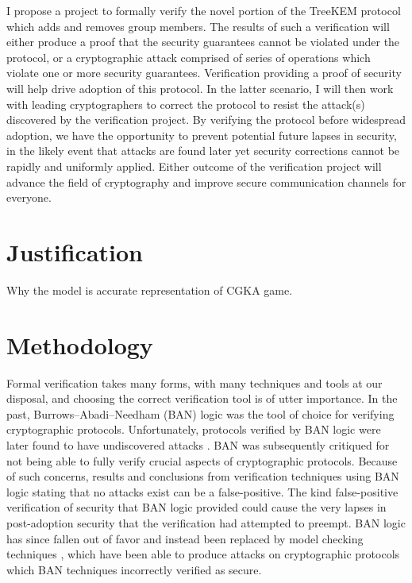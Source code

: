 \documentclass[12pt,twocolumn]{article}
\begin{document}
	I propose a project to formally verify the novel portion of the TreeKEM protocol which adds and removes group members.
	The results of such a verification will either produce a proof that the security guarantees cannot be violated under the protocol, or a cryptographic attack comprised of series of operations which violate one or more security guarantees.
	Verification providing a proof of security will help drive adoption of this protocol.
	In the latter scenario, I will then work with leading cryptographers to correct the protocol to resist the attack(s) discovered by the verification project.
	By verifying the protocol before widespread adoption, we have the opportunity to prevent potential future lapses in security, in the likely event that attacks are found later yet security corrections cannot be rapidly and uniformly applied.
	Either outcome of the verification project will advance the field of cryptography and improve secure communication channels for everyone.
	
	\section*{Justification}
	
	Why the model is accurate representation of CGKA game.
	
	\section*{Methodology}
	
	Formal verification takes many forms, with many techniques and tools at our disposal, and choosing the correct verification tool is of utter importance.
	In the past, Burrows–Abadi–Needham (BAN) \cite{burrows1989logic} logic was the tool of choice for verifying cryptographic protocols.
	Unfortunately, protocols verified by BAN logic were later found to have undiscovered attacks \cite{10.5555/188307.188350}.
	BAN was subsequently critiqued for not being able to fully verify crucial aspects of cryptographic protocols.
	Because of such concerns, results and conclusions from verification techniques using BAN logic stating that no attacks exist can be a false-positive.
	The kind false-positive verification of security that BAN logic provided could cause the very lapses in post-adoption security that the verification had attempted to preempt.
	BAN logic has since fallen out of favor and instead been replaced by model checking techniques \cite{marrero1997model}, which have been able to produce attacks on cryptographic protocols which BAN techniques incorrectly verified as secure.
	
\end{document}
